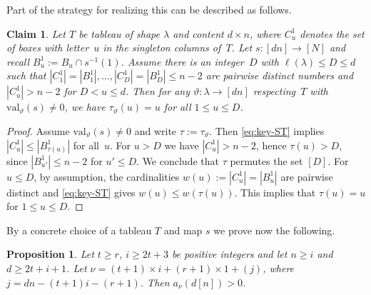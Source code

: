 \documentclass[11pt]{amsart}
\def\la{\lambda}
\newcommand{\out}{d}
\newcommand{\inn}{n}
\newcommand{\val}{\mathrm{val}}
\numberwithin{equation}{section}
\newtheorem{proposition}[theorem]{Proposition}
\newtheorem{claim}[theorem]{Claim}
\begin{document}
Part of the strategy for realizing this can be described as follows. 

\begin{claim}\label{le:s=id}
Let $T$ be tableau of shape $\la$ and content $d\times n$,
where $C^1_u$ denotes the set of boxes with letter~$u$ in the singleton columns of~$T$.
Let $s\colon [dn] \to [N]$ and recall 
$B^1_u:= B_u \cap s^{-1}(1)$. 
Assume there is an integer~$D$ with $\ell(\la) \le D \le d$ such that 
$|C^1_1| = |B^1_1|,\ldots,|C^1_D| = |B^1_D| \le n-2$ 
are pairwise distinct numbers 
and $|C^1_u| > n-2$ for $D<u \le d$.  
Then for any $\vartheta\colon\la \to [dn]$ respecting~$T$ 
with $\val_\vartheta(s) \ne 0$, 
we have 
$\tau_\vartheta(u) = u$ for all $1\le u \le D$. 
\end{claim}


\begin{proof}
Assume $\val_\vartheta(s) \ne 0$ 
and write $\tau:= \tau_\vartheta$. Then \eqref{eq:key-ST} implies 
$|C^1_u| \le |B^1_{\tau(u)}|$ for all~$u$. 
For $u>D$ we have $|C^1_u| > n-2$, hence  $\tau(u) >D$, 
since $|B^1_{u'}| \le n-2$ for $u'\le D$. 
We conclude that $\tau$ permutes the set $[D]$. 
For $u\le D$, by assumption, 
the cardinalities $w(u) := |C^1_u| = |B^1_{u}|$ are pairwise distinct 
and \eqref{eq:key-ST} gives $w(u) \le  w(\tau(u))$.
This implies that $\tau(u)= u$ for $1\le u\le D$.
\end{proof}

By a concrete choice of a tableau $T$ and map $s$ we prove now the following. 

\begin{proposition}\label{prop:short_column}
Let $t \geq r$, $i \geq 2t+3$ be positive integers and let $\inn \geq i$ and $\out \geq 2t+i+1$. 
Let $\nu = (t+1) \times i + (r+1) \times 1 + (j)$, where $j=\out\inn - (t+1)i -(r+1)$. Then $a_{\nu}(\out[\inn]) >0$. 
\end{proposition}
\end{document}
